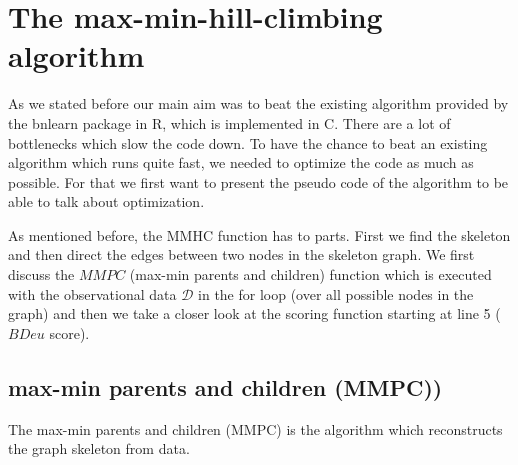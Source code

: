 			 \label{img.add}

			 \label{img.reverse}

			 \label{img.delete}
			

\chapter{The max-min-hill-climbing algorithm}

	As we stated before our main aim was to beat the existing algorithm provided by the bnlearn package in R, which is implemented in C. There are a lot of bottlenecks which slow the code down. To have the chance to beat an existing algorithm which runs quite fast, we needed to optimize the code as much as possible. For that we first want to present the pseudo code of the algorithm to be able to talk about optimization.

	 \label{img.mmhc}

	As mentioned before, the MMHC function has to parts. First we find the skeleton and then direct the edges between two nodes in the skeleton graph. We first discuss the $MMPC$ (max-min parents and children) function which is executed with the observational data $\mathcal{D}$ in the for loop (over all possible nodes in the graph) and then we take a closer look at the scoring function starting at line 5 ($BDeu$ score).

		\section{max-min parents and children (MMPC))}

			The max-min parents and children (MMPC) is the algorithm which reconstructs the graph skeleton from data.%

